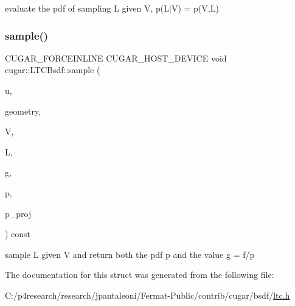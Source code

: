 evaluate the pdf of sampling L given V, p(L$\vert$V) = p(\+V,\+L) \mbox{\label{structcugar_1_1_l_t_c_bsdf_a6c2148d6ccc764cf424d50e7c106bded}} 
\subsubsection{\texorpdfstring{sample()}{sample()}}
{\footnotesize\ttfamily C\+U\+G\+A\+R\+\_\+\+F\+O\+R\+C\+E\+I\+N\+L\+I\+NE C\+U\+G\+A\+R\+\_\+\+H\+O\+S\+T\+\_\+\+D\+E\+V\+I\+CE void cugar\+::\+L\+T\+C\+Bsdf\+::sample (\begin{DoxyParamCaption}\item[{const \hyperlink{structcugar_1_1_vector}{Vector3f}}]{u,  }\item[{const \hyperlink{structcugar_1_1_differential_geometry}{Differential\+Geometry} \&}]{geometry,  }\item[{const \hyperlink{structcugar_1_1_vector}{Vector3f}}]{V,  }\item[{\hyperlink{structcugar_1_1_vector}{Vector3f} \&}]{L,  }\item[{\hyperlink{structcugar_1_1_vector}{Vector3f} \&}]{g,  }\item[{float \&}]{p,  }\item[{float \&}]{p\+\_\+proj }\end{DoxyParamCaption}) const\hspace{0.3cm}{\ttfamily [inline]}}

sample L given V and return both the pdf p and the value g = f/p 

The documentation for this struct was generated from the following file\+:\begin{DoxyCompactItemize}
\item 
C\+:/p4research/research/jpantaleoni/\+Fermat-\/\+Public/contrib/cugar/bsdf/\hyperlink{ltc_8h}{ltc.\+h}\end{DoxyCompactItemize}
